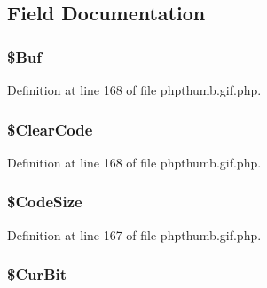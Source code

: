 \subsection{\-Field \-Documentation}
\hypertarget{class_c_g_i_f_l_z_w_ac277f177d33aa72d96f815d666102c2d}{
\subsubsection[{\$\-Buf}]{\setlength{\rightskip}{0pt plus 5cm}\$\-Buf}}\label{class_c_g_i_f_l_z_w_ac277f177d33aa72d96f815d666102c2d}


\-Definition at line 168 of file phpthumb.\-gif.\-php.

\hypertarget{class_c_g_i_f_l_z_w_aa60a54399281ea06e41d5e5b31c67b10}{
\subsubsection[{\$\-Clear\-Code}]{\setlength{\rightskip}{0pt plus 5cm}\$\-Clear\-Code}}\label{class_c_g_i_f_l_z_w_aa60a54399281ea06e41d5e5b31c67b10}


\-Definition at line 168 of file phpthumb.\-gif.\-php.

\hypertarget{class_c_g_i_f_l_z_w_a1dab473004b0c5e0c23f4062f6564e2c}{
\subsubsection[{\$\-Code\-Size}]{\setlength{\rightskip}{0pt plus 5cm}\$\-Code\-Size}}\label{class_c_g_i_f_l_z_w_a1dab473004b0c5e0c23f4062f6564e2c}


\-Definition at line 167 of file phpthumb.\-gif.\-php.

\hypertarget{class_c_g_i_f_l_z_w_a58d4a0652a9b7a6711ca225d5cb69148}{
\subsubsection[{\$\-Cur\-Bit}]{\setlength{\rightskip}{0pt plus 5cm}\$\-Cur\-Bit}}\label{class_c_g_i_f_l_z_w_a58d4a0652a9b7a6711ca225d5cb69148}


